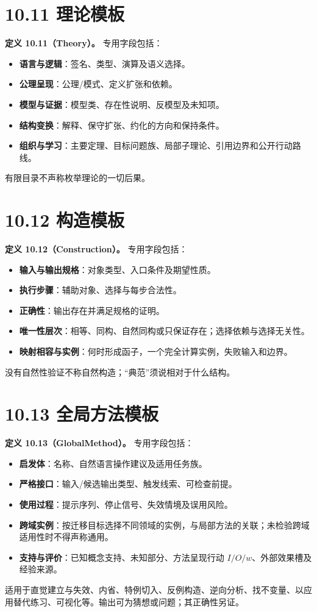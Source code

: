 \documentclass[UTF8,a4paper,zihao=-4,fontset=windows,openany]{ctexbook}
\begin{document}
\section{10.11 理论模板}
\textbf{定义 10.11（Theory）。} 专用字段包括：

\begin{itemize}
\item \textbf{语言与逻辑}：签名、类型、演算及语义选择。
\item \textbf{公理呈现}：公理/模式、定义扩张和依赖。
\item \textbf{模型与证据}：模型类、存在性说明、反模型及未知项。
\item \textbf{结构变换}：解释、保守扩张、约化的方向和保持条件。
\item \textbf{组织与学习}：主要定理、目标问题族、局部子理论、引用边界和公开行动路线。
\end{itemize}
有限目录不声称枚举理论的一切后果。

\section{10.12 构造模板}
\textbf{定义 10.12（Construction）。} 专用字段包括：

\begin{itemize}
\item \textbf{输入与输出规格}：对象类型、入口条件及期望性质。
\item \textbf{执行步骤}：辅助对象、选择与每步合法性。
\item \textbf{正确性}：输出存在并满足规格的证明。
\item \textbf{唯一性层次}：相等、同构、自然同构或只保证存在；选择依赖与选择无关性。
\item \textbf{映射相容与实例}：何时形成函子，一个完全计算实例，失败输入和边界。
\end{itemize}
没有自然性验证不称自然构造；“典范”须说相对于什么结构。

\section{10.13 全局方法模板}
\textbf{定义 10.13（GlobalMethod）。} 专用字段包括：

\begin{itemize}
\item \textbf{启发体}：名称、自然语言操作建议及适用任务族。
\item \textbf{严格接口}：输入/候选输出类型、触发线索、可检查前提。
\item \textbf{使用过程}：提示序列、停止信号、失效情境及误用风险。
\item \textbf{跨域实例}：按迁移目标选择不同领域的实例，与局部方法的关联；未检验跨域适用性时不得声称通用。
\item \textbf{支持与评价}：已知概念支持、未知部分、方法呈现行动 \(I/O/w\)、外部效果槽及经验来源。
\end{itemize}
适用于直觉建立与失效、内省、特例切入、反例构造、逆向分析、找不变量、以应用替代练习、可视化等。输出可为猜想或问题；其正确性另证。
\end{document}
